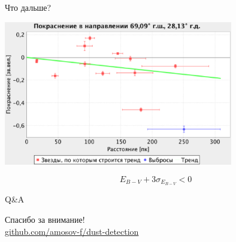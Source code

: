 \documentclass[14pt, fleqn, xcolor={dvipsnames, table}]{beamer}
\begin{document}
        \begin{frame}{Что дальше?}
            \begin{center}
                \includegraphics[width=10cm]{real-4-k.eps}
            \end{center}  
            $$E_{B - V} + 3 \sigma_{E_{B - V}} < 0$$
        \end{frame} 
        
	
        \begin{frame}{Q\&A}
            \begin{center}
                Спасибо за внимание!\\
                \href{https://github.com/amosov-f/dust-detection}{github.com/amosov-f/dust-detection}
            \end{center}
        \end{frame}
\end{document}
